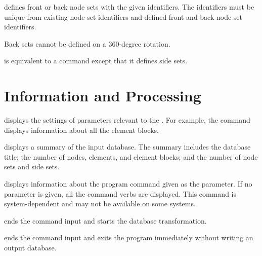  {
 defines front or back node sets with the given
identifiers. The identifiers must be unique from existing node 
set identifiers and defined front and back node set identifiers.

Back sets cannot be defined on a 360-degree rotation.
}

 {
 is equivalent to a  command except that it
defines side sets.
}

\newpage
\section{Information and Processing}
\label{cmd:info}

 {
 displays the settings of parameters relevant to the
. For example, the command  displays
information about all the element blocks.
}

 {
 displays a summary of the input database. The summary
includes the database title; the number of nodes, elements, and
element blocks; and the number of node sets and side sets.
}

 {
 displays information about the program command given as the
parameter. If no parameter is given, all the command verbs are
displayed. This command is system-dependent and may not be available on
some systems.
}

 {
 ends the command input and starts the database transformation.
}

 {
 ends the command input and exits the program immediately
without writing an output database.
}
